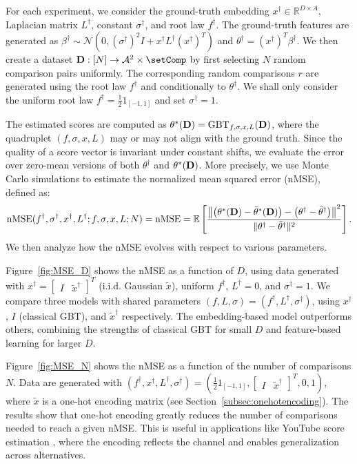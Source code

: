 \documentclass{article}
\newcommand{\cA}{\mathcal A}
\newcommand{\bD}{{\bf D}}
\begin{document}
For each experiment, we consider the ground-truth embedding $ x^\dagger \in \mathbb{R}^{D\times A}$,  Laplacian matrix $ L^\dagger $, constant $\sigma^\dagger$, and  root law $ f^\dagger$. The ground-truth features are generated as
$\beta^\dagger \sim \mathcal{N}(0, (\sigma^\dagger)^2 I + x^\dagger L^\dagger (x^\dagger)^T)$ and $\theta^\dagger = (x^\dagger)^T \beta^\dagger$.
We then create a dataset $ \bD : [N] \rightarrow \cA^2 \times \setComp $ by first selecting $ N $ random comparison pairs uniformly. The corresponding random comparisons $ r $ are generated using the root law $f^\dagger$ and conditionally to $\theta^\dagger$.
We shall only consider the uniform root law $ f^\dagger = \frac{1}{2} 1_{[-1 , 1]} $ and set $\sigma^\dagger = 1$.

The estimated scores are computed as 
$\theta^*(\bD) = \text{GBT}_{f,\sigma,x,L}(\bD)$, 
where the quadruplet $(f, \sigma, x, L)$ may or may not align with the ground truth. 
Since the quality of a score vector is invariant under constant shifts, 
we evaluate the error over zero-mean versions of both $\theta^\dagger$ and $\theta^*(\bD)$.
More precisely, we use Monte Carlo simulations to estimate 
the normalized mean squared error (nMSE), defined as:
$$
\text{nMSE}(f^\dagger, \sigma^\dagger, x^\dagger, L^\dagger ; f, \sigma, x, L; N) = \text{nMSE} = \mathbb{E} \left[\frac{\left\| \left(\theta^*(\bD) - \bar{\theta}^*(\bD) \right) - \left(\theta^\dagger - \bar{\theta}^\dagger \right) \right\|^2}{\|\theta^\dagger - \bar{\theta}^\dagger \|^2} \right].
$$
We then analyze how the nMSE evolves with respect to various parameters.


Figure~\ref{fig:MSE_D} shows the nMSE as a function of $D$, using data generated with $x^\dagger = \begin{bmatrix} I & \tilde{x}^\dagger \end{bmatrix}^T$ (i.i.d. Gaussian $\tilde{x}$), uniform $f^\dagger$, $L^\dagger = 0$, and $\sigma^\dagger = 1$.
We compare three models with shared parameters $(f, L, \sigma) = (f^\dagger, L^\dagger, \sigma^\dagger)$, using $x^\dagger$, $I$ (classical GBT), and $\tilde{x}^\dagger$ respectively. The embedding-based model outperforms others, combining the strengths of classical GBT for small $D$ and feature-based learning for larger $D$.

Figure~\ref{fig:MSE_N} shows the nMSE as a function of the number of comparisons $N$. Data are generated with $(f^\dagger, x^\dagger, L^\dagger, \sigma^\dagger) = \left( \frac{1}{2} 1_{[-1 , 1]}, \begin{bmatrix} I & \tilde{x}^\dagger \end{bmatrix}^T, 0 , 1 \right)$, where $\tilde{x}$ is a one-hot encoding matrix (see Section~\ref{subsec:onehotencoding}). 
The results show that one-hot encoding greatly reduces the number of comparisons needed to reach a given nMSE. This is useful in applications like YouTube score estimation \cite{hoang2024solidagomodularcollaborativescoring}, where the encoding reflects the channel and enables generalization across alternatives.
\end{document}
